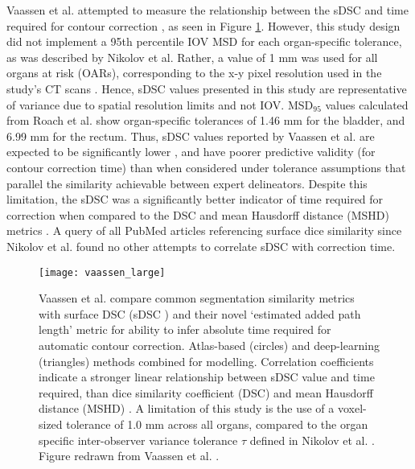 Vaassen et al. attempted to measure the relationship between the sDSC and time
required for contour correction \cite{vaassen2020}, as seen in Figure
\ref{fig:vaassen}. However, this study design did not implement a 95th
percentile IOV MSD for each organ-specific tolerance, as was described by
Nikolov et al. Rather, a value of 1 mm was used for all organs at risk (OARs),
corresponding to the x-y pixel resolution used in the study's CT scans
\cite{vaassen2020}. Hence, sDSC values presented in this study are
representative of variance due to spatial resolution limits and not IOV.
MSD$_{95}$ values calculated from Roach et al. show organ-specific tolerances of
1.46 mm for the bladder, and 6.99 mm for the rectum. Thus, sDSC values reported
by Vaassen et al. are expected to be significantly lower \cite{Nikolov_2018},
and have poorer predictive validity (for contour correction time) than when
considered under tolerance assumptions that parallel the similarity achievable
between expert delineators. Despite this limitation, the sDSC was a
significantly better indicator of time required for correction when compared to
the DSC and mean Hausdorff distance (MSHD) metrics \cite{vaassen2020}. A query
of all PubMed articles referencing surface dice similarity since Nikolov et al.
found no other attempts to correlate sDSC with correction time.

\begin{figure}[h]
	\begin{center}
		\texttt{[image: vaassen\_large]}
		\caption{Vaassen et al. compare common segmentation similarity metrics with
      surface DSC (sDSC \cite{Nikolov_2018}) and their novel `estimated added
      path length' metric for ability to infer absolute time required for
      automatic contour correction. Atlas-based (circles) and deep-learning
      (triangles) methods combined for modelling. Correlation coefficients
      indicate a stronger linear relationship between sDSC value and time required,
      than dice similarity coefficient (DSC) and mean Hausdorff distance (MSHD)
      \cite{Vaassen_2020}. A limitation of this study is the use of a voxel-sized 
      tolerance of 1.0 mm across all organs, compared to the organ
      specific inter-observer variance tolerance $\tau$ defined in Nikolov et
      al. \cite{Nikolov_2018}. Figure redrawn from Vaassen et al.  \cite{Vaassen_2020}.}
		\label{fig:vaassen}
	\end{center}
\end{figure}



